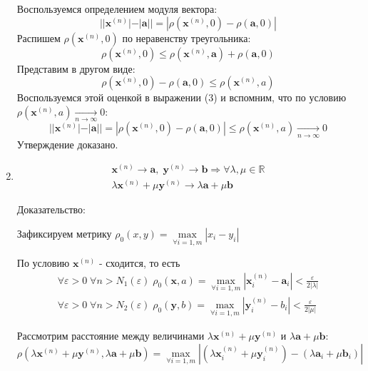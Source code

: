 \begin{enumerate}
  Воспользуемся определением модуля вектора:
  \begin{equation}
  ||\textbf {x}^{(n)}| - |\textbf {a}|| = |\rho(\textbf {x}^{(n)}, 0) - \rho(\textbf {a}, 0)|
  \end{equation}
  Распишем $\rho(\textbf {x}^{(n)}, 0)$ по неравенству треугольника:
  $$
  \rho(\textbf {x}^{(n)}, 0) \leq \rho(\textbf {x}^{(n)}, \textbf {a}) + \rho(\textbf {a}, 0) 
  $$
  Представим в другом виде:
  $$
  \rho(\textbf {x}^{(n)}, 0) - \rho(\textbf {a}, 0) \leq \rho(\textbf {x}^{(n)}, a)
  $$
  Воспользуемся этой оценкой в выражении (3) и вспомним, что по условию ${\rho(\textbf {x}^{(n)}, a) \underset{n \to \infty}{\longrightarrow} 0}$:
  $$
  ||\textbf {x}^{(n)}| - |\textbf {a}|| = |\rho(\textbf {x}^{(n)}, 0) - \rho(\textbf {a}, 0)| \leq \rho(\textbf {x}^{(n)}, a) \underset{n \to \infty}{\longrightarrow} 0
  $$
  Утверждение доказано.
  \item
  \begin{equation*}
  \begin{gathered}
  \textbf {x}^{(n)} \longrightarrow \textbf {a}, \; \textbf {y}^{(n)} \longrightarrow \textbf {b} \Rightarrow \forall \lambda, \mu \in \mathbb {R}\\
  \lambda \textbf {x}^{(n)} + \mu \textbf {y}^{(n)} \longrightarrow \lambda \textbf {a} + \mu \textbf {b}
  \end{gathered}
  \end{equation*}
  
  Доказательство:
  
  Зафиксируем метрику $\rho_0(x, y) = \underset{\forall i=1, m}{\max}{|x_i - y_i|}$
  
  По условию $\textbf {x}^{(n)}$ - сходится, то есть
  \begin{equation*}
  \begin{gathered}
  \forall \varepsilon > 0 \; \forall n > N_1(\varepsilon) \;\rho_0(\textbf {x}, a) = \underset{\forall i=1, m}{\max}{|\textbf{x}^{(n)}_i - \textbf{a}_i|} < \frac{\varepsilon}{2|\lambda|}\\
    \forall \varepsilon > 0 \; \forall n > N_2(\varepsilon) \;\rho_0(\textbf {y}, b) = \underset{\forall i=1, m}{\max}{|\textbf{y}^{(n)}_i - b_i|} < \frac{\varepsilon}{2|\mu|}
  \end{gathered}
  \end{equation*}
  
  Рассмотрим расстояние между величинами $ \lambda \textbf {x}^{(n)} + \mu \textbf {y}^{(n)}$ и $\lambda \textbf {a} + \mu \textbf {b}$:
  $$
  \rho(\lambda \textbf {x}^{(n)} + \mu \textbf {y}^{(n)}, \lambda \textbf {a} + \mu \textbf {b}) = \underset{\forall i=1, m}{\max}{|(\lambda \textbf {x}^{(n)}_i + \mu \textbf {y}^{(n)}_i) - (\lambda \textbf {a}_i + \mu \textbf {b}_i)|}
  $$
  

\end{enumerate}
